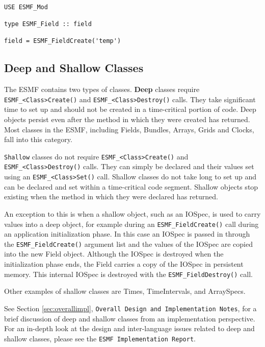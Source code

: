 \begin{verbatim}

USE ESMF_Mod

type ESMF_Field :: field

field = ESMF_FieldCreate('temp')

\end{verbatim}

\subsection{Deep and Shallow Classes}
\label{sec:deepshallow}

The ESMF contains two types of classes.  {\bf Deep} classes require
{\tt ESMF\_<Class>Create()} and {\tt ESMF\_<Class>Destroy()} calls.
They take significant time to set up and should not be created
in a time-critical portion of code.  Deep objects persist 
even after the method in which they were created has returned.
Most classes in the ESMF, including Fields, Bundles, Arrays,
Grids and Clocks, fall into this category.

{\tt Shallow} classes do not require {\tt ESMF\_<Class>Create()}
 and {\tt ESMF\_<Class>Destroy()} calls.  They can simply be declared
and their values set using an {\tt ESMF\_<Class>Set()} call.  Shallow
classes do not take long to set up and can be declared and set within
a time-critical code segment.  Shallow objects stop existing when
the method in which they were declared has returned.  

An exception to this is when a shallow object, such as an IOSpec, 
is used to carry values into a deep object, for example during an 
{\tt ESMF\_FieldCreate()} call during an application initialization 
phase.  In this case an IOSpec is passed
in through the {\tt ESMF\_FieldCreate()} argument list and the values 
of the IOSpec are copied into the new Field object.  Although the 
IOSpec is destroyed when the initialization phase ends, 
the Field carries a copy of the IOSpec in persistent memory.  This 
internal IOSpec is destroyed with the {\tt ESMF\_FieldDestroy()} call.

Other examples of shallow classes are Times, TimeIntervals, and 
ArraySpecs.

See Section \ref{sec:overallimpl}, {\tt Overall Design and Implementation 
Notes}, for a brief discussion of deep and shallow classes from 
an implementation perspective.  For an in-depth look at the design 
and inter-language issues related to deep and shallow classes, please 
see the {\tt ESMF Implementation Report}.

